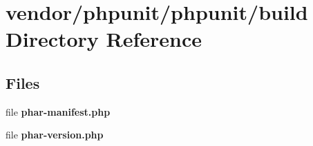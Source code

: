 \section{vendor/phpunit/phpunit/build Directory Reference}
\label{dir_1e9b3b40e4d3d464e62b8972de15044e}
\subsection*{Files}
\begin{DoxyCompactItemize}
\item 
file {\bf phar-\/manifest.\+php}
\item 
file {\bf phar-\/version.\+php}
\end{DoxyCompactItemize}
